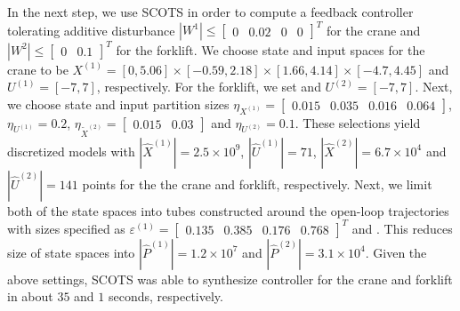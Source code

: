 In the next step, we use SCOTS in order to compute a feedback controller tolerating additive disturbance $|W^1|\leq\begin{bmatrix}0&0.02&0&0\end{bmatrix}^T$ for the crane and $|W^2|\leq\begin{bmatrix}0&0.1\end{bmatrix}^T$ for the forklift. %
We choose state and input spaces for the crane to be $X^{(1)}=[0,5.06]\times[-0.59,2.18]\times[1.66,4.14]\times[-4.7,4.45]$ and $U^{(1)}=[-7,7]$, respectively. For the forklift, we set  and $U^{(2)}=[-7,7]$. %
Next, we choose state and input partition sizes $\eta_{{X}^{(1)}}=\begin{bmatrix}0.015&0.035&0.016&0.064\end{bmatrix}$, $\eta_{U^{(1)}}=0.2$,  $\eta_{\widetilde{X}^{(2)}}=\begin{bmatrix}0.015&0.03\end{bmatrix}$ and $\eta_{U^{(2)}}=0.1$. These selections yield discretized models with $|\hat X^{(1)}|=2.5\times 10^9$, $|\hat U^{(1)}|=71$, $|\hat X^{(2)}|=6.7\times 10^4$ and $|\hat U^{(2)}|=141$ points for the the crane and forklift, respectively. Next, we limit both of the state spaces into tubes constructed around the open-loop trajectories with sizes specified as $\varepsilon^{(1)}=\begin{bmatrix}0.135&0.385&0.176 &0.768\end{bmatrix}^T$ and . This reduces size of state spaces into $|\hat P^{(1)}|=1.2\times 10^7$ and $|\hat P^{(2)}|=3.1\times 10^4$. Given the above settings, SCOTS was able to synthesize controller for the crane and forklift in about $35$ and $1$ seconds, respectively.
			
